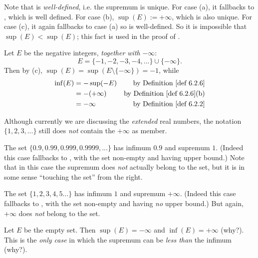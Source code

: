 \begin{note}
Note that  is \emph{well-defined}, i.e. the supremum is unique.
For case (a), it fallbacks to , which is well defined.
For case (b), \(\sup(E) := +\infty\), which is also unique.
For case (c), it again fallbacks to case (a) so is well-defined.
So it is impossible that \(\sup(E) < \sup(E)\); this fact is used in the proof of .
\end{note}

\begin{example} \label{example 6.2.7}
Let \(E\) be the negative integers, \emph{together with} \(-\infty\):
\[
    E = \{-1, -2, -3, -4,...\} \cup \{-\infty\}.
\]
Then by (c), \(\sup(E) = \sup(E \setminus \{-\infty\}) = -1\), while
\begin{align*}
    \inf(E) & = -\sup(-E) & \text{by \DEF{6.2.6}} \\
           & = -(+\infty) & \text{by \DEF{6.2.6}(b)} \\
           & = -\infty & \text{by \DEF{6.2.2}}
\end{align*}
\end{example}

\begin{note}
Although currently we are discussing the \emph{extended} real numbers, the notation \(\{1, 2, 3, ...\}\) still does \emph{not} contain the \(+\infty\) as member.
\end{note}

\begin{example} \label{example 6.2.8}
The set \(\{0.9, 0.99, 0.999, 0.9999,...\}\) has infimum \(0.9\) and supremum \(1\).
(Indeed this case fallbacks to , with the set non-empty and having upper bound.)
Note that in this case the supremum does \emph{not} actually
belong to the set, but it is in some sense ``touching the set'' from the right.
\end{example}

\begin{example} \label{example 6.2.9}
The set \(\{1, 2, 3, 4, 5 ...\}\) has infimum \(1\) and supremum \(+\infty\). (Indeed this case fallbacks to , with the set non-empty and having \emph{no} upper bound.)
But again, \(+\infty\) does \emph{not} belong to the set.
\end{example}

\begin{example} \label{example 6.2.10}
Let \(E\) be the empty set.
Then \(\sup(E) = -\infty\) and \(\inf(E) = +\infty\) (why?).
This is the \emph{only case} in which the supremum can be \emph{less than} the infimum (why?).
\end{example}

